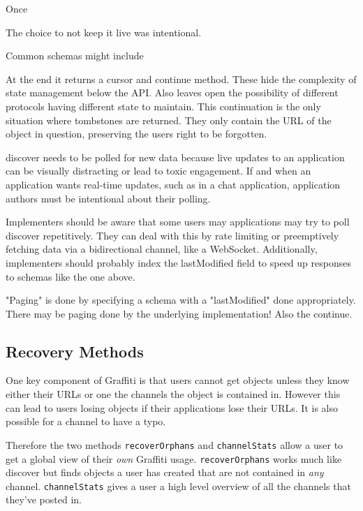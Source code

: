 Once

The choice to not keep it live was intentional.

Common schemas might include

At the end it returns a cursor and continue method.
These hide the complexity of state management below the API.
Also leaves open the possibility of different protocols having different state to maintain.
This continuation is the only situation where tombstones are returned.
They only contain the URL of the object in question, preserving the users right to be forgotten.

discover needs to be polled for new data because live updates to an application can be visually distracting or lead to toxic engagement. If and when an application wants real-time updates, such as in a chat application, application authors must be intentional about their polling.

Implementers should be aware that some users may applications may try to poll discover repetitively. They can deal with this by rate limiting or preemptively fetching data via a bidirectional channel, like a WebSocket. Additionally, implementers should probably index the lastModified field to speed up responses to schemas like the one above.

"Paging" is done by specifying a schema with a "lastModified" done appropriately.
There may be paging done by the underlying implementation!
Also the continue.

\subsection{Recovery Methods}

One key component of Graffiti is that users cannot get objects
unless they know either their URLs or one the channels the object
is contained in.
However this can lead to users losing objects if their applications
lose their URLs. It is also possible for a channel to have a typo.

Therefore the two methods \texttt{recoverOrphans} and \texttt{channelStats}
allow a user to get a global view of their \emph{own} Graffiti usage.
\texttt{recoverOrphans} works much like discover but finds objects
a user has created that are not contained in \emph{any} channel.
\texttt{channelStats} gives a user a high level overview of all the
channels that they've posted in.
